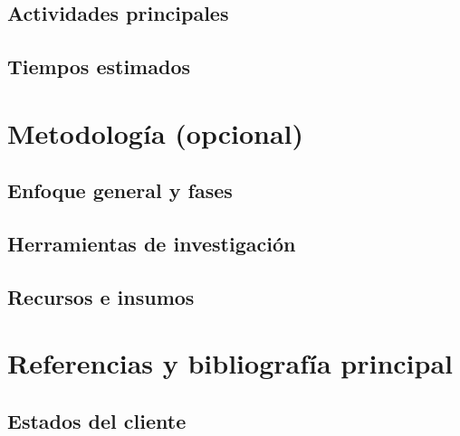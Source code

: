 \subsection{Actividades principales}
\subsection{Tiempos estimados}

\section{Metodología (opcional)}
\subsection{Enfoque general y fases}
\subsection{Herramientas de investigación}
\subsection{Recursos e insumos}

\section{Referencias y bibliografía principal}


\begin{appendixd}

	\section{Estados del cliente}

    \subsection{}



\end{appendixd}

